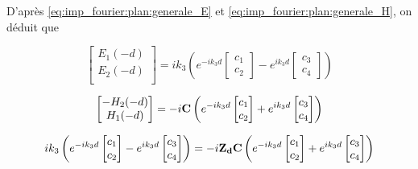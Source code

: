 D'après \eqref{eq:imp_fourier:plan:generale_E} et \eqref{eq:imp_fourier:plan:generale_H}, on déduit que

\begin{equation}
    \begin{bmatrix}
        E_1(-d)\\
        E_2(-d)\\
    \end{bmatrix}
    = ik_3\left( e^{-ik_3 d}
    \begin{bmatrix}
        c_1 \\
        c_2
    \end{bmatrix}
    -e^{ik_3 d}
    \begin{bmatrix}
        c_3 \\
        c_4
    \end{bmatrix}
    \right)
\end{equation}

\begin{equation}
    \begin{bmatrix}
        -H_2(-d)\\
        H_1(-d)\\
    \end{bmatrix}
    =-i
    \mathbf{C}
    \left(
        e^{-ik_3 d}
        \begin{bmatrix}
            c_1 \\
            c_2
        \end{bmatrix}
        +e^{ik_3 d}
        \begin{bmatrix}
            c_3 \\
            c_4
        \end{bmatrix}
    \right)
\end{equation}

\begin{equation}
    ik_3\left( e^{-ik_3 d}
    \begin{bmatrix}
        c_1 \\
        c_2
    \end{bmatrix}
    -e^{ik_3 d}
    \begin{bmatrix}
        c_3 \\
        c_4
    \end{bmatrix}
    \right)
    =-i\mathbf{Z_d}\mathbf{C}
    \left(
        e^{-ik_3 d}
        \begin{bmatrix}
            c_1 \\
            c_2
        \end{bmatrix}
        +e^{ik_3 d}
        \begin{bmatrix}
            c_3 \\
            c_4
        \end{bmatrix}
    \right)
\end{equation}

